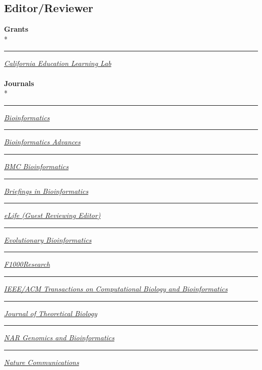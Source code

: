 \documentclass[margin,line]{res}
\begin{document}
\begin{resume}
\section{\sc Editor/Reviewer}
\textbf{Grants}\\*
\rule{-1mm}{5mm} \hspace*{4mm} \href{http://opr.ca.gov/learninglab/}{\textit{California Education Learning Lab}}\\
~\\
\textbf{Journals}\\*
\rule{-1mm}{5mm} \hspace*{4mm} \href{https://academic.oup.com/bioinformatics}{\textit{Bioinformatics}}\\
\rule{-1mm}{5mm} \hspace*{4mm} \href{https://academic.oup.com/bioinformaticsadvances}{\textit{Bioinformatics Advances}}\\
\rule{-1mm}{5mm} \hspace*{4mm} \href{https://bmcbioinformatics.biomedcentral.com/}{\textit{BMC Bioinformatics}}\\
\rule{-1mm}{5mm} \hspace*{4mm} \href{https://academic.oup.com/bib}{\textit{Briefings in Bioinformatics}}\\
\rule{-1mm}{5mm} \hspace*{4mm} \href{https://elifesciences.org/}{\textit{eLife (Guest Reviewing Editor)}}\\
\rule{-1mm}{5mm} \hspace*{4mm} \href{https://journals.sagepub.com/home/evb}{\textit{Evolutionary Bioinformatics}}\\
\rule{-1mm}{5mm} \hspace*{4mm} \href{https://f1000research.com}{\textit{F1000Research}}\\
\rule{-1mm}{6mm} \hspace*{4mm} \href{https://ieeexplore.ieee.org/xpl/aboutJournal.jsp?punumber=8857}{\textit{IEEE/ACM Transactions on Computational Biology and Bioinformatics
}}\\
\rule{-1mm}{5mm} \hspace*{4mm} \href{https://www.sciencedirect.com/journal/journal-of-theoretical-biology}{\textit{Journal of Theoretical Biology}}\\
\rule{-1mm}{5mm} \hspace*{4mm} \href{https://academic.oup.com/nargab}{\textit{NAR Genomics and Bioinformatics}}\\
\rule{-1mm}{5mm} \hspace*{4mm} \href{https://www.nature.com/ncomms}{\textit{Nature Communications}}\\

\end{resume}
\end{document}
